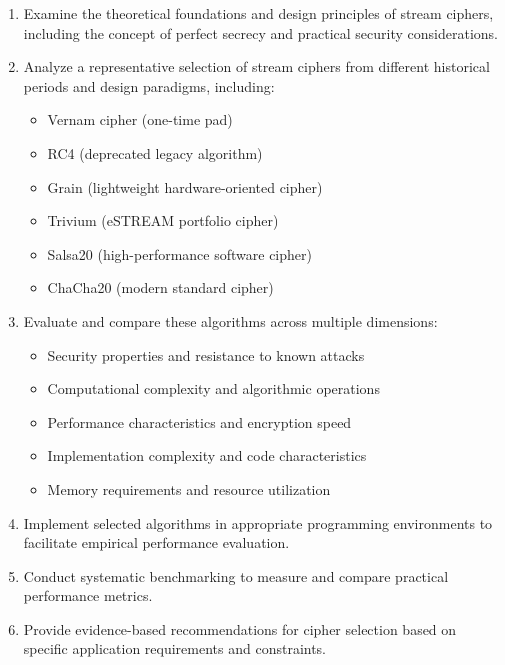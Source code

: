 \documentclass[12pt,a4paper,oneside]{report}
\begin{document}
\begin{enumerate}
    \item Examine the theoretical foundations and design principles of stream ciphers, including the concept of perfect secrecy and practical security considerations.
    
    \item Analyze a representative selection of stream ciphers from different historical periods and design paradigms, including:
    \begin{itemize}
        \item Vernam cipher (one-time pad)
        \item RC4 (deprecated legacy algorithm)
        \item Grain (lightweight hardware-oriented cipher)
        \item Trivium (eSTREAM portfolio cipher)
        \item Salsa20 (high-performance software cipher)
        \item ChaCha20 (modern standard cipher)
    \end{itemize}
    
    \item Evaluate and compare these algorithms across multiple dimensions:
    \begin{itemize}
        \item Security properties and resistance to known attacks
        \item Computational complexity and algorithmic operations
        \item Performance characteristics and encryption speed
        \item Implementation complexity and code characteristics
        \item Memory requirements and resource utilization
    \end{itemize}
    
    \item Implement selected algorithms in appropriate programming environments to facilitate empirical performance evaluation.
    
    \item Conduct systematic benchmarking to measure and compare practical performance metrics.
    
    \item Provide evidence-based recommendations for cipher selection based on specific application requirements and constraints.
\end{enumerate}
\end{document}
